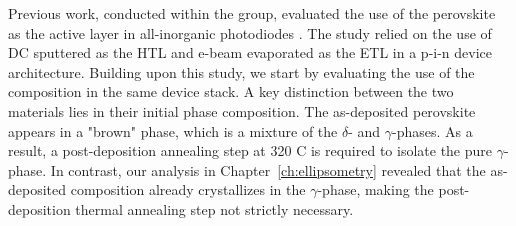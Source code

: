 Previous work, conducted within the group, evaluated the use of the  perovskite as the active layer in all-inorganic photodiodes \cite{PintorMonroy2021All-EvaporatedApplications}. The study relied on the use of DC sputtered  as the HTL and e-beam evaporated  as the ETL in a p-i-n  device architecture. Building upon this study, we start by evaluating the use of the  composition in the same device stack. A key distinction between the two materials lies in their initial phase composition. The as-deposited  perovskite appears in a "brown" phase, which is a mixture of the $\delta$- and $\gamma$-phases. As a result, a post-deposition annealing step at 320 \degree C is required to isolate the pure $\gamma$-phase. In contrast, our analysis in Chapter~\ref{ch:ellipsometry} revealed that the as-deposited  composition already crystallizes in the $\gamma$-phase, making the post-deposition thermal annealing step not strictly necessary. 

